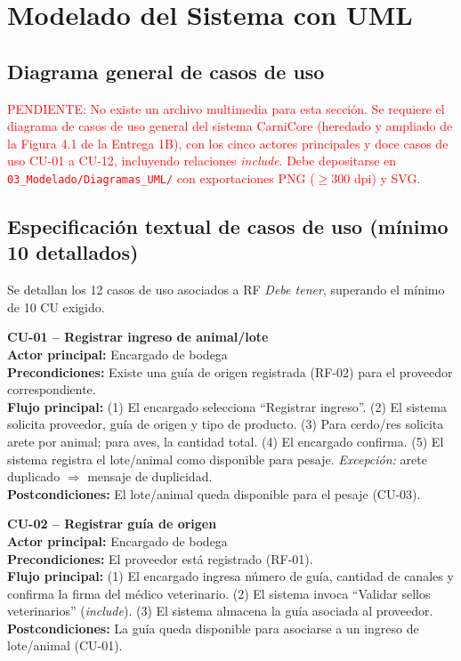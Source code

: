 \documentclass[11pt,a4paper]{article}
\begin{document}
\section{Modelado del Sistema con UML}
\subsection{Diagrama general de casos de uso}
\textcolor{red}{PENDIENTE: No existe un archivo multimedia para esta sección. Se requiere el diagrama de casos de uso general del sistema CarniCore (heredado y ampliado de la Figura 4.1 de la Entrega 1B), con los cinco actores principales y doce casos de uso CU-01 a CU-12, incluyendo relaciones \textit{include}. Debe depositarse en \texttt{03\_Modelado/Diagramas\_UML/} con exportaciones PNG ($\geq$300 dpi) y SVG.}

\subsection{Especificación textual de casos de uso (mínimo 10 detallados)}
Se detallan los 12 casos de uso asociados a RF \textit{Debe tener}, superando el mínimo de 10 CU exigido.

\newcommand{\cuitem}[6]{%
\noindent\textbf{#1 -- #2}\\
\textbf{Actor principal:} #3\\
\textbf{Precondiciones:} #4\\
\textbf{Flujo principal:} #5\\
\textbf{Postcondiciones:} #6
\vspace{0.35cm}
}

\cuitem{CU-01}{Registrar ingreso de animal/lote}{Encargado de bodega}{Existe una guía de origen registrada (RF-02) para el proveedor correspondiente.}{
(1) El encargado selecciona ``Registrar ingreso''. (2) El sistema solicita proveedor, guía de origen y tipo de producto. (3) Para cerdo/res solicita arete por animal; para aves, la cantidad total. (4) El encargado confirma. (5) El sistema registra el lote/animal como disponible para pesaje. \textit{Excepción:} arete duplicado $\Rightarrow$ mensaje de duplicidad.}{
El lote/animal queda disponible para el pesaje (CU-03).}

\cuitem{CU-02}{Registrar guía de origen}{Encargado de bodega}{El proveedor está registrado (RF-01).}{
(1) El encargado ingresa número de guía, cantidad de canales y confirma la firma del médico veterinario. (2) El sistema invoca ``Validar sellos veterinarios'' (\textit{include}). (3) El sistema almacena la guía asociada al proveedor.}{
La guía queda disponible para asociarse a un ingreso de lote/animal (CU-01).}
\end{document}
